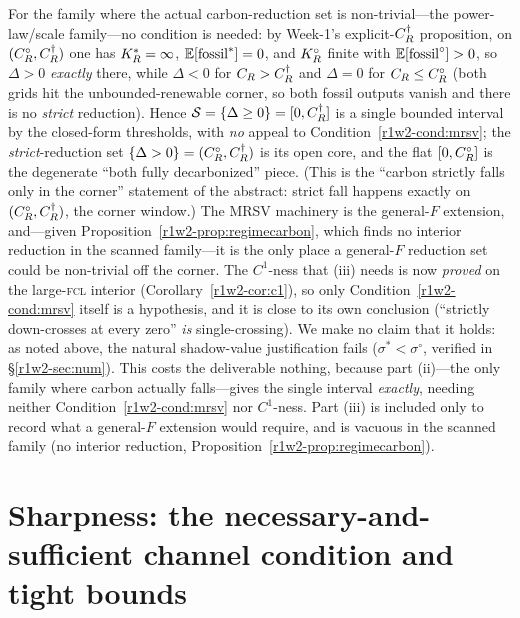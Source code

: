 \begin{remark}
For the family where the actual carbon-reduction set is non-trivial---the
power-law/scale family---no condition is needed: by Week-1's explicit-$C_R^{\dagger}$ proposition,
on $(C_R^{\circ},C_R^{\dagger})$ one has $K_R^{*}=\infty$, $\mathbb{E}[\text{fossil}^{*}]=0$,
and $K_R^{\circ}$ finite with $\mathbb{E}[\text{fossil}^{\circ}]>0$, so $\Delta>0$ \emph{exactly}
there, while $\Delta<0$ for $C_R>C_R^{\dagger}$ and $\Delta=0$ for
$C_R\le C_R^{\circ}$ (both grids hit the unbounded-renewable corner, so both fossil
outputs vanish and there is no \emph{strict} reduction). Hence
$\mathcal S=\{\Delta\ge0\}=[0,C_R^{\dagger}]$ is a single bounded interval by the
closed-form thresholds, with \emph{no} appeal to Condition~\ref{r1w2-cond:mrsv}; the
\emph{strict}-reduction set $\{\Delta>0\}=(C_R^{\circ},C_R^{\dagger})$ is its open
core, and the flat $[0,C_R^{\circ}]$ is the degenerate ``both fully decarbonized''
piece. (This is the ``carbon strictly falls only in the corner'' statement of the
abstract: strict fall happens exactly on $(C_R^{\circ},C_R^{\dagger})$, the corner
window.) The MRSV machinery
is the general-$F$ extension, and---given Proposition~\ref{r1w2-prop:regimecarbon}, which
finds no interior reduction in the scanned family---it is the only place a general-$F$
reduction set could be non-trivial off the corner. The $C^{1}$-ness that (iii)
needs is now \emph{proved} on the large-\textsc{fcl} interior
(Corollary~\ref{r1w2-cor:c1}), so only Condition~\ref{r1w2-cond:mrsv} itself is a hypothesis,
and it is close to its own conclusion (``strictly down-crosses at every zero''
\emph{is} single-crossing). We make no claim that it holds: as noted above, the
natural shadow-value justification fails ($\sigma^{*}<\sigma^{\circ}$, verified in
\S\ref{r1w2-sec:num}). This costs the deliverable nothing, because part (ii)---the only
family where carbon actually falls---gives the single interval \emph{exactly},
needing neither Condition~\ref{r1w2-cond:mrsv} nor $C^{1}$-ness. Part (iii) is included
only to record what a general-$F$ extension would require, and is vacuous in the
scanned family (no interior reduction, Proposition~\ref{r1w2-prop:regimecarbon}).
\end{remark}

\section{Sharpness: the necessary-and-sufficient channel condition and tight bounds}\label{r1w2-sec:sharp}


